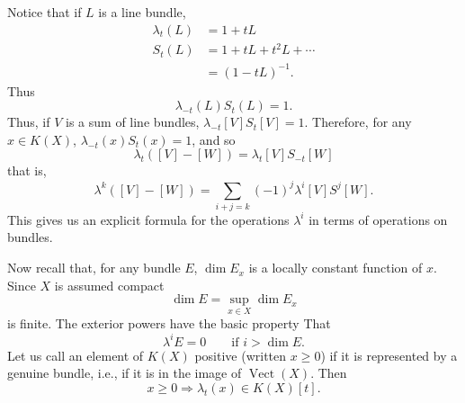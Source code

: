 \documentclass[leqno]{book}
\numberwithin{equation}{section}
\theoremstyle{definition}
\begin{document}
            Notice that if $L$ is a line bundle,
            \begin{equation*}
              \begin{aligned}
              \lambda_{t}(L)&= 1+tL \\
              S_{t}(L)&=1+tL+t^{2}L+ \cdots \\
              &= (1-tL)^{-1}.
              \end{aligned}
            \end{equation*}
            Thus
            \begin{equation*}
              \lambda_{-t}(L)S_{t}(L)=1.
            \end{equation*}
            Thus, if $V$ is a sum of line bundles, $\lambda_{-t}[V]S_{t}[V]=1$. Therefore, for any $x\in K(X)$, $\lambda_{-t}(x)S_{t}(x)=1$, and so
            \begin{equation*}
              \lambda_{t}([V]-[W])=\lambda_{t}[V]S_{-t}[W]
            \end{equation*}
            that is,
            \begin{equation*}
              \lambda^{k}([V]-[W])= \sum_{i+j=k}(-1)^{j}\lambda^{i}[V]S^{j}[W].
            \end{equation*}
            This gives us an explicit formula for the operations $\lambda^{i}$ in terms of operations on bundles.

            Now recall that, for any bundle $E$, $\operatorname{dim}E_{x}$ is a locally constant function of $x$. Since $X$ is assumed compact
            \begin{equation*}
              \operatorname{dim}E=\sup_{x\in X} \operatorname{dim}E_{x}
            \end{equation*}
            is finite. The exterior powers have the basic property That
            \begin{equation*}
              \lambda^{i}E =0 \qquad \text{if } i>\operatorname{dim}E.
            \end{equation*}
            Let us call an element of $K(X)$ positive (written $x\ge 0$) if it is represented by a genuine bundle, i.e., if it is in the image of $\operatorname{Vect}(X)$. Then
            \begin{equation*}
              x\ge 0\Rightarrow \lambda_{t}(x)\in K(X)[t].
            \end{equation*}
\end{document}
